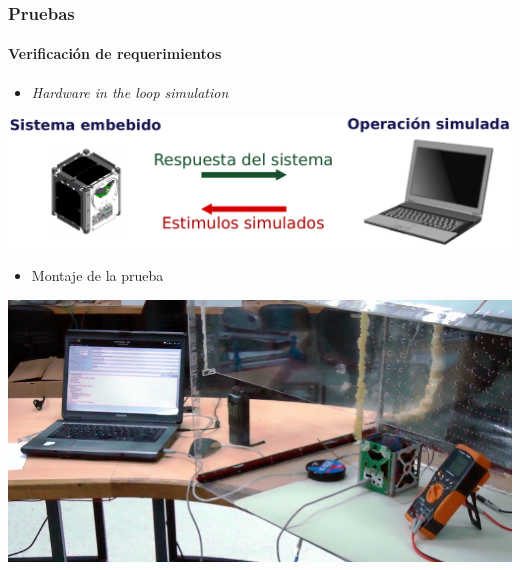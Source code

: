\documentclass[xcolor=dvipsnames]{beamer}
\begin{document}
%         
    
    \begin{frame}[squeeze]
        \frametitle{Pruebas}
        \framesubtitle{Verificación de requerimientos}
        
        \begin{itemize}
            \item \textit{Hardware in the loop simulation}
        \end{itemize}
        
        \begin{center}
            \includegraphics[height=0.3\textheight]{img/hil.pdf}
        \end{center}
        
        \begin{itemize}
            \item Montaje de la prueba
        \end{itemize}
        
        \begin{center}
            \includegraphics[height=0.45\textheight]{img/test_montaje.jpg}
        \end{center}
        
    \end{frame}
\end{document}

